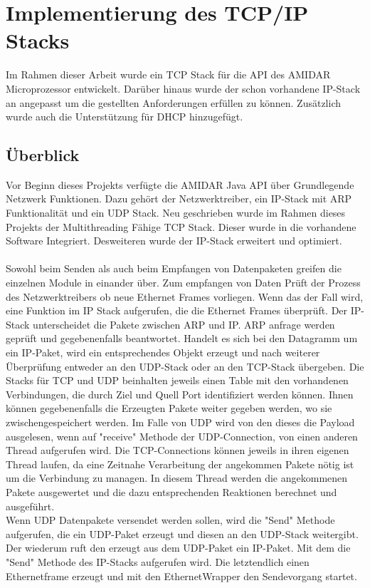 \chapter{Implementierung des TCP/IP Stacks}
Im Rahmen dieser Arbeit wurde ein TCP Stack für die API des AMIDAR Microprozessor entwickelt. Darüber hinaus wurde der schon vorhandene IP-Stack an angepasst um die gestellten Anforderungen erfüllen zu können. Zusätzlich wurde auch die Unterstützung für DHCP hinzugefügt.

\section{Überblick}
Vor Beginn dieses Projekts verfügte die AMIDAR Java API über Grundlegende Netzwerk Funktionen. Dazu gehört der Netzwerktreiber, ein IP-Stack mit ARP Funktionalität und ein UDP Stack. Neu geschrieben wurde im Rahmen dieses Projekts der Multithreading Fähige TCP Stack. Dieser wurde in die vorhandene Software Integriert. Desweiteren wurde der IP-Stack erweitert und optimiert.\\\\
Sowohl beim Senden als auch beim Empfangen von Datenpaketen greifen die einzelnen Module in einander über. Zum empfangen von Daten Prüft der Prozess des Netzwerktreibers ob neue Ethernet Frames vorliegen. Wenn das der Fall wird, eine Funktion im IP Stack aufgerufen, die die Ethernet Frames überprüft. Der IP-Stack unterscheidet die Pakete zwischen ARP und IP. ARP anfrage werden geprüft und gegebenenfalls beantwortet. Handelt es sich bei den Datagramm um ein IP-Paket, wird ein entsprechendes Objekt erzeugt und nach weiterer Überprüfung entweder an den UDP-Stack oder an den TCP-Stack übergeben. Die Stacks für TCP und UDP beinhalten jeweils einen Table mit den vorhandenen Verbindungen, die durch Ziel und Quell Port identifiziert werden können. Ihnen können gegebenenfalls die Erzeugten Pakete weiter gegeben werden, wo sie zwischengespeichert werden. Im Falle von UDP wird von den dieses die Payload ausgelesen, wenn auf "receive"{} Methode der UDP-Connection, von einen anderen Thread aufgerufen wird. Die TCP-Connections können jeweils in ihren eigenen Thread laufen, da eine Zeitnahe Verarbeitung der angekommen Pakete nötig ist um die Verbindung zu managen. In diesem Thread werden die angekommenen Pakete ausgewertet und die dazu entsprechenden Reaktionen berechnet und ausgeführt. \\
Wenn UDP Datenpakete versendet werden sollen, wird die {}"Send"{} Methode aufgerufen, die ein UDP-Paket erzeugt und diesen an den UDP-Stack weitergibt. Der wiederum ruft den erzeugt aus dem UDP-Paket ein IP-Paket. Mit dem die {}"Send"{} Methode des IP-Stacks aufgerufen wird. Die letztendlich einen Ethernetframe erzeugt und mit den EthernetWrapper den Sendevorgang startet.\\ \\
